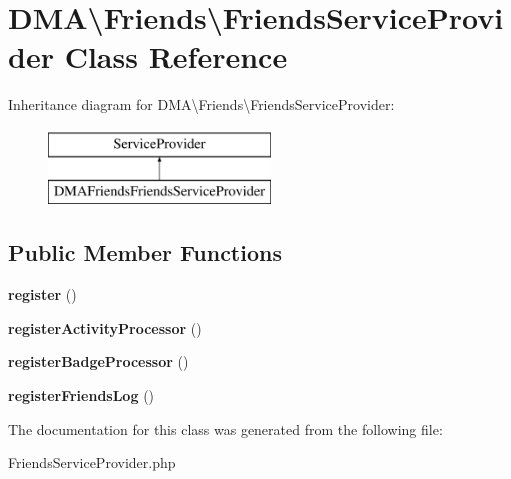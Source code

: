 \hypertarget{classDMA_1_1Friends_1_1FriendsServiceProvider}{\section{D\-M\-A\textbackslash{}Friends\textbackslash{}Friends\-Service\-Provider Class Reference}
\label{classDMA_1_1Friends_1_1FriendsServiceProvider}
}
Inheritance diagram for D\-M\-A\textbackslash{}Friends\textbackslash{}Friends\-Service\-Provider\-:\begin{figure}[H]
\begin{center}
\leavevmode
\includegraphics[height=2.000000cm]{df/d6d/classDMA_1_1Friends_1_1FriendsServiceProvider}
\end{center}
\end{figure}
\subsection*{Public Member Functions}
\begin{DoxyCompactItemize}
\item 
\hypertarget{classDMA_1_1Friends_1_1FriendsServiceProvider_a6a90d2cdc4c6b153b45764ba66e154ae}{{\bfseries register} ()}\label{classDMA_1_1Friends_1_1FriendsServiceProvider_a6a90d2cdc4c6b153b45764ba66e154ae}

\item 
\hypertarget{classDMA_1_1Friends_1_1FriendsServiceProvider_acac19246d5282897b8e0ce6265ed5ef3}{{\bfseries register\-Activity\-Processor} ()}\label{classDMA_1_1Friends_1_1FriendsServiceProvider_acac19246d5282897b8e0ce6265ed5ef3}

\item 
\hypertarget{classDMA_1_1Friends_1_1FriendsServiceProvider_a8c3cfb466bb9300f3909797a6b58b634}{{\bfseries register\-Badge\-Processor} ()}\label{classDMA_1_1Friends_1_1FriendsServiceProvider_a8c3cfb466bb9300f3909797a6b58b634}

\item 
\hypertarget{classDMA_1_1Friends_1_1FriendsServiceProvider_a2d6ff7101ca6389c00e298f2d594a1df}{{\bfseries register\-Friends\-Log} ()}\label{classDMA_1_1Friends_1_1FriendsServiceProvider_a2d6ff7101ca6389c00e298f2d594a1df}

\end{DoxyCompactItemize}


The documentation for this class was generated from the following file\-:\begin{DoxyCompactItemize}
\item 
Friends\-Service\-Provider.\-php\end{DoxyCompactItemize}
